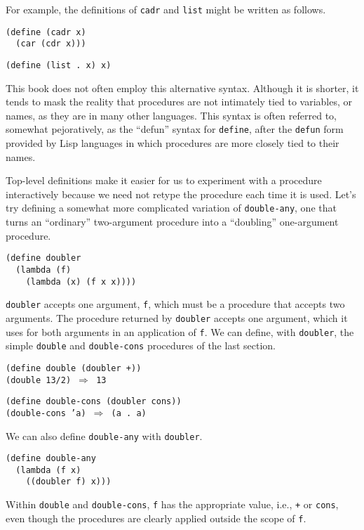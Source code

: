 For example, the definitions of \label{start_s85}\texttt{cadr} and \label{start_s86}\texttt{list} might be written
as follows.


\begin{alltt}
(define (cadr x)
  (car (cdr x)))

(define (list . x) x)
\end{alltt}


This book does not often employ this alternative syntax.
Although it is shorter, it tends to mask the reality that procedures
are not intimately tied to variables, or names, as they are in many
other languages.
This syntax is often referred to, somewhat pejoratively,
as the \label{start_s87}``defun'' syntax for \texttt{define}, after the
\texttt{defun} form provided by Lisp languages in which procedures are more
closely tied to their names.


Top-level definitions make it easier for us to experiment with a
procedure interactively
because we need not retype the procedure each time it is used.
Let's try defining a somewhat more complicated variation of \texttt{double-any},
one that turns an ``ordinary'' two-argument procedure into a ``doubling''
one-argument \label{start_s88}procedure.


\begin{alltt}
(define doubler
  (lambda (f)
    (lambda (x) (f x x))))
\end{alltt}

\texttt{doubler} accepts one argument, \texttt{f}, which must be a
procedure that accepts two arguments.
The procedure returned by \texttt{doubler} accepts one argument, which
it uses for both arguments in an application of \texttt{f}.
We can define, with \texttt{doubler}, the simple
\label{start_s89}\texttt{double} and
\label{start_s90}\texttt{double-cons} procedures
of the last section.

\begin{alltt}
(define double (doubler +))
(double 13/2) \(\Rightarrow\) 13

(define double-cons (doubler cons))
(double-cons 'a) \(\Rightarrow\) (a . a)
\end{alltt}


We can also define \texttt{double-any} with \texttt{doubler}.


\begin{alltt}
(define double-any
  (lambda (f x)
    ((doubler f) x)))
\end{alltt}


Within \texttt{double} and
\texttt{double-cons}, \texttt{f} has the appropriate value, i.e., \texttt{+}
or \texttt{cons}, even though the procedures are clearly applied outside the
scope of \texttt{f}.


